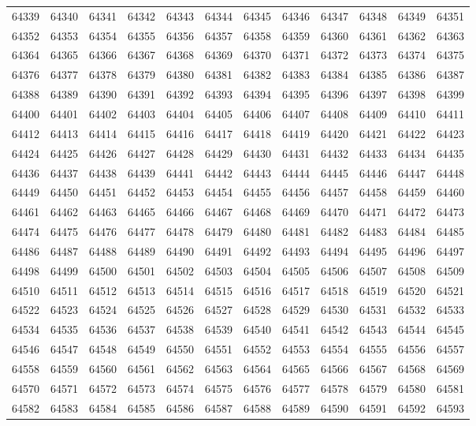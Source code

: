 \begin{center}
\begin{longtable}{llllllllllll}
64339 &64340 &64341 &64342 &64343 &64344 &64345 &64346 &64347 &64348 &64349 &64351 \\
64352 &64353 &64354 &64355 &64356 &64357 &64358 &64359 &64360 &64361 &64362 &64363 \\
64364 &64365 &64366 &64367 &64368 &64369 &64370 &64371 &64372 &64373 &64374 &64375 \\
64376 &64377 &64378 &64379 &64380 &64381 &64382 &64383 &64384 &64385 &64386 &64387 \\
64388 &64389 &64390 &64391 &64392 &64393 &64394 &64395 &64396 &64397 &64398 &64399 \\
64400 &64401 &64402 &64403 &64404 &64405 &64406 &64407 &64408 &64409 &64410 &64411 \\
64412 &64413 &64414 &64415 &64416 &64417 &64418 &64419 &64420 &64421 &64422 &64423 \\
64424 &64425 &64426 &64427 &64428 &64429 &64430 &64431 &64432 &64433 &64434 &64435 \\
64436 &64437 &64438 &64439 &64441 &64442 &64443 &64444 &64445 &64446 &64447 &64448 \\
64449 &64450 &64451 &64452 &64453 &64454 &64455 &64456 &64457 &64458 &64459 &64460 \\
64461 &64462 &64463 &64465 &64466 &64467 &64468 &64469 &64470 &64471 &64472 &64473 \\
64474 &64475 &64476 &64477 &64478 &64479 &64480 &64481 &64482 &64483 &64484 &64485 \\
64486 &64487 &64488 &64489 &64490 &64491 &64492 &64493 &64494 &64495 &64496 &64497 \\
64498 &64499 &64500 &64501 &64502 &64503 &64504 &64505 &64506 &64507 &64508 &64509 \\
64510 &64511 &64512 &64513 &64514 &64515 &64516 &64517 &64518 &64519 &64520 &64521 \\
64522 &64523 &64524 &64525 &64526 &64527 &64528 &64529 &64530 &64531 &64532 &64533 \\
64534 &64535 &64536 &64537 &64538 &64539 &64540 &64541 &64542 &64543 &64544 &64545 \\
64546 &64547 &64548 &64549 &64550 &64551 &64552 &64553 &64554 &64555 &64556 &64557 \\
64558 &64559 &64560 &64561 &64562 &64563 &64564 &64565 &64566 &64567 &64568 &64569 \\
64570 &64571 &64572 &64573 &64574 &64575 &64576 &64577 &64578 &64579 &64580 &64581 \\
64582 &64583 &64584 &64585 &64586 &64587 &64588 &64589 &64590 &64591 &64592 &64593 \\

\end{longtable}
\end{center}
